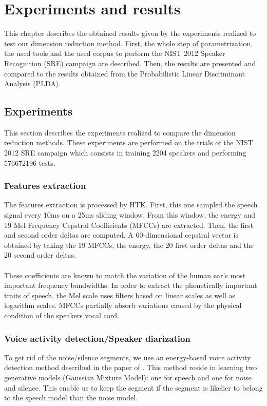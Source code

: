 \documentclass{techrep}
\begin{document}
\chapter{Experiments and results}

This chapter describes the obtained results given by the experiments
realized to test our dimension reduction method. First, the whole step
of parametrization, the used tools and the used corpus to perform
the NIST 2012 Speaker Recognition (SRE) campaign are described. Then, the results are
presented and compared to the results obtained from the Probabilistic
Linear Discriminant Analysis (PLDA).

\section{Experiments}

This section describes the experiments realized to compare the
dimension reduction methods. These experiments are performed on the
trials of the NIST 2012 SRE campaign which consists in training 2204
speakers and performing 576672196 tests. %

\subsection{Features extraction}

The features extraction is processed by HTK. First, this one sampled
the speech signal every 10ms on a 25ms sliding window. From this
window, the energy and 19 Mel-Frequency Cepstral Coefficients (MFCCs)
are extracted.  Then, the first and second order deltas are
computed. A 60-dimensional cepstral vector is obtained by taking the
19 MFCCs, the energy, the 20 first order deltas and the 20 second
order deltas.\\\\ These coefficients are known to match the variation
of the human ear's most important frequency bandwidths. In order to
extract the phonetically important traits of speech, the Mel scale
uses filters based on linear scales as well as logarithm scales. MFCCs
partially absorb variations caused by the physical condition of the
speakers vocal cord.

\subsection{Voice activity detection/Speaker diarization}

To get rid of the noise/silence segments, we use an energy-based voice
activity detection method described in the paper of \cite{CRIM}.  This
method reside in learning two generative models (Gaussian Mixture
Model): one for speech and one for noise and silence. This enable us
to keep the segment if the segment is likelier to belong to the speech
model than the noise model.
\end{document}
